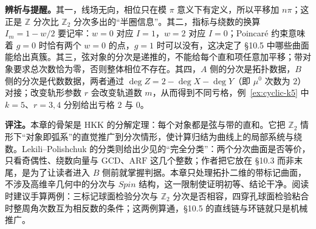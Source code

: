 {\textbf{辨析与提醒。}其一，线场无向，相位只在模 $\pi$ 意义下有定义，所以平移加 $n\pi$；这正是 $\mathbb Z$ 分次比 $\mathbb Z_2$ 分次多出的“半圈信息”。其二，指标与绕数的换算 $I_m=1-w/2$ 要记牢：$w=0$ 对应 $I=1$，$w=2$ 对应 $I=0$；Poincaré 约束意味着 $g=0$ 时恰有两个 $w=0$ 的点，$g=1$ 时可以没有，这决定了 §10.5 中哪些曲面能给出真簇。其三，弦对象的分次是递推的，不能给每个直和项任意加平移；带对象要求总次数恰为零，否则整体相位不存在。其四，$A$ 侧的分次是拓扑数据，$B$ 侧的分次是代数数据，两者通过 $\deg Z=2-\deg X-\deg Y$（即 $\mu^0$ 次数为 $2$）对接；改变轨形参数 $r$ 会改变轨道数 $m$，从而得到不同亏格，例~\ref{ex:cyclic-k5} 中 $k=5$、$r=3,4$ 分别给出亏格 $2$ 与 $0$。

\textbf{评注。}本章的骨架是 HKK 的分解定理：每个对象都是弦与带的直和。它把 $\mathbb Z_2$ 情形下“对象即弧系”的直觉推广到分次情形，使计算归结为曲线上的局部系统与绕数。Lekili--Polishchuk 的分类则给出少见的“完全分类”：两个分次曲面是否等价，只看奇偶性、绕数向量与 $\mathrm{GCD}$、$\mathrm{ARF}$ 这几个整数；作者把它放在 §10.3 而非末尾，是为了让读者进入 $B$ 侧前就掌握判据。本章只处理拓扑二维的带标记曲面，不涉及高维辛几何中的分次与 $Spin$ 结构，这一限制使证明初等、结论干净。阅读时建议手算两例：三标记球面检验分次与 $\mathbb Z_2$ 分次是否相容，四穿孔球面检验粘合时整周角次数互为相反数的条件；这两例算通，§10.5 的直线链与环链就只是机械推广。}

